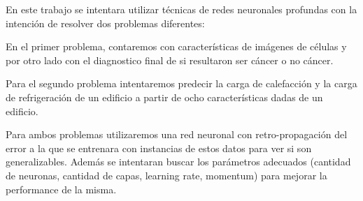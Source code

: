 En este trabajo se intentara utilizar técnicas de redes neuronales profundas con la intención de resolver dos problemas diferentes:

En el primer problema, contaremos con características de imágenes de células y por otro lado con el diagnostico final de si resultaron ser cáncer o no cáncer.

Para el segundo problema intentaremos predecir la carga de calefacción y la carga de refrigeración de un edificio a partir de ocho características dadas de un edificio.

Para ambos problemas utilizaremos una red neuronal con retro-propagación del error a la que se entrenara con instancias de estos datos para ver si son generalizables. Además se intentaran buscar los parámetros adecuados (cantidad de neuronas, cantidad de capas, learning rate, momentum) para mejorar la performance de la misma.